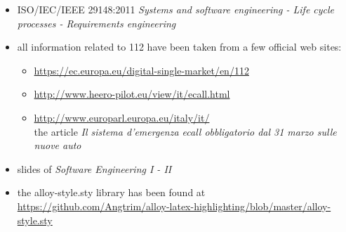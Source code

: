 \begin{itemize}
	\item ISO/IEC/IEEE 29148:2011 \emph{Systems and software engineering - Life cycle processes - Requirements engineering}
	\item all information related to 112 have been taken from a few official web sites:
		\begin{itemize}
			\item \url{https://ec.europa.eu/digital-single-market/en/112}
			\item \url{http://www.heero-pilot.eu/view/it/ecall.html}
			\item \url{http://www.europarl.europa.eu/italy/it/}\\ the article \emph{Il sistema d'emergenza ecall obbligatorio dal 				31 marzo sulle nuove auto}
		\end{itemize}
	\item slides of \emph{Software Engineering I - II}
	\item the alloy-style.sty library has been found at \url{https://github.com/Angtrim/alloy-latex-highlighting/blob/master/alloy-style.sty}
\end{itemize}
